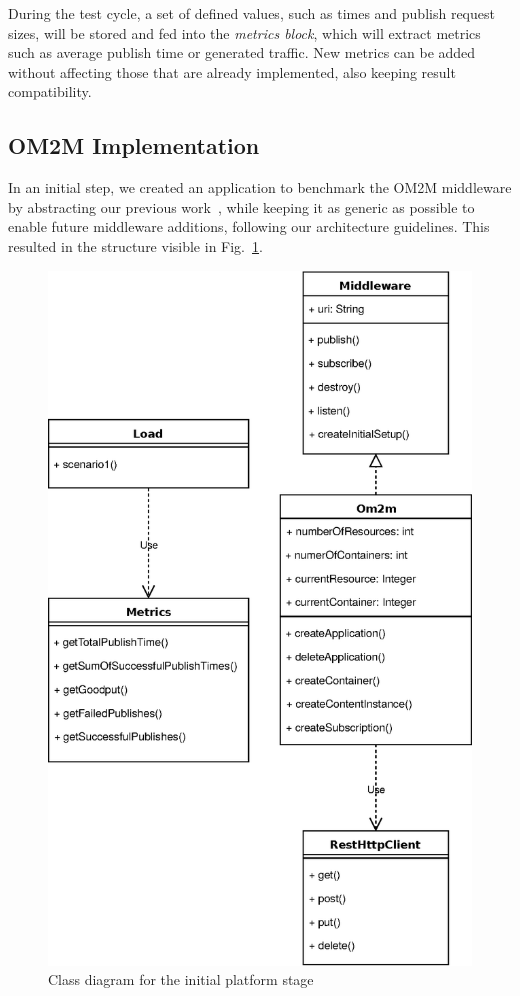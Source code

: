 \documentclass[conference]{IEEEtran}
\begin{document}
During the test cycle, a set of defined values, such as times and publish request sizes, will be stored and fed into the \textit{metrics block}, which will extract metrics such as average publish time or generated traffic. New metrics can be added without affecting those that are already implemented, also keeping result compatibility. 

\subsection{OM2M Implementation}
In an initial step, we created an application to benchmark the OM2M middleware by abstracting our previous work~\cite{pereira_benchmarking_2018,cardoso_benchmarking_2017}, while keeping it as generic as possible to enable future middleware additions, following our architecture guidelines. This resulted in the structure visible in Fig.~\ref{fig:class_diagram_om2m}.

\begin{figure}[htbp!]
  \centering
  \includegraphics[width=\linewidth]{figures/class_diagram.eps}
  \caption{Class diagram for the initial platform stage}
  \label{fig:class_diagram_om2m}
\end{figure}
\end{document}
